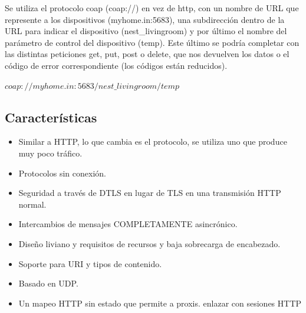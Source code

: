 \documentclass[12pt]{report} %
\begin{document}
Se utiliza el protocolo coap (coap://) en vez de http, con un nombre de URL que represente a los dispositivos (myhome.in:5683), una subdirección dentro de la URL para indicar el dispositivo (nest\_livingroom) y por último el nombre del parámetro de control del dispositivo (temp). Este último se podría completar con las distintas peticiones get, put, post o delete, que nos devuelven los datos o el código de error correspondiente (los códigos están reducidos).

$coap://myhome.in:5683/nest\_livingroom/temp$

\subsection{Características}
\begin{itemize}
	\item Similar a HTTP, lo que cambia es el protocolo, se utiliza uno que produce muy poco tráfico.
	\item Protocolos sin conexión.
	\item Seguridad a través de DTLS en lugar de TLS en una transmisión HTTP normal.
	\item Intercambios de mensajes COMPLETAMENTE asincrónico.
	\item Diseño liviano y requisitos de recursos y baja sobrecarga de encabezado.
	\item Soporte para URI y tipos de contenido.
	\item Basado en UDP.
	\item Un mapeo HTTP sin estado que permite a proxis.
	enlazar con sesiones HTTP
\end{itemize}
\end{document}
